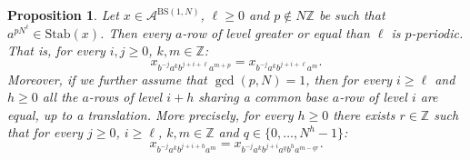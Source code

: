 \documentclass{aims}
\newcommand{\BS}[1][N]{\mathrm{BS}(1,#1)}
\newtheorem{proposition}{Proposition}
\theoremstyle{definition}
\begin{document}
\begin{proposition}\label{prop:bs_periodicity_p_generalcase}
	Let $x\in \mathcal{A}^{\BS}$, $\ell\ge 0$ and $p\notin N\mathbb{Z}$ be such that $a^{pN^\ell}\in \mathrm{Stab}(x)$. Then every $a$-row of level greater or equal than $\ell$ is $p$-periodic. That is, for every $i,j\ge 0$, $k,m\in \mathbb{Z}$:
	$$
	x_{b^{-j}a^kb^{j+i+\ell}a^{m+p}}=x_{b^{-j}a^kb^{j+i+\ell}a^{m}}.
	$$
	Moreover, if we further assume that $\gcd(p,N)=1$, then for every $i\ge \ell$ and $h\ge 0$ all the $a$-rows of level $i+h$ sharing a common base $a$-row of level $i$ are equal, up to a translation. More precisely, for every $h\ge 0$ there exists $r\in \mathbb{Z}$ such that for every $j\ge 0$, $i\ge \ell$, $k,m\in \mathbb{Z}$ and $q\in \{0,\ldots,N^h-1\}$:
	$$
	x_{b^{-j}a^{k}b^{j+i+h}a^{m}}=x_{b^{-j}a^{k}b^{j+i}a^{q}b^{h}a^{m-qr}}.
	$$
	
\end{proposition}
\end{document}
